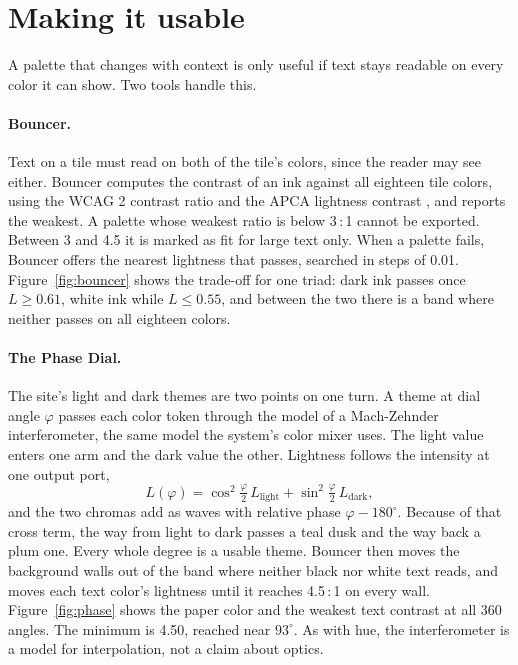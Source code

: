\documentclass[11pt,a4paper]{article}
\theoremstyle{qresult}
\begin{document}
\section{Making it usable}
\label{sec:usable}

A palette that changes with context is only useful if text stays readable on every color it can show. Two tools
handle this.

\paragraph{Bouncer.} Text on a tile must read on both of the tile's colors, since the reader may see either. Bouncer
computes the contrast of an ink against all eighteen tile colors, using the WCAG 2 contrast ratio \citep{wcag22} and
the APCA lightness contrast \citep{apca}, and reports the weakest. A palette whose weakest ratio is below 3\,:\,1
cannot be exported. Between 3 and 4.5 it is marked as fit for large text only. When a palette fails, Bouncer offers
the nearest lightness that passes, searched in steps of 0.01. Figure~\ref{fig:bouncer} shows the trade-off for one
triad: dark ink passes once $L \ge 0.61$, white ink while $L \le 0.55$, and between the two there is a band where
neither passes on all eighteen colors.

\paragraph{The Phase Dial.} The site's light and dark themes are two points on one turn. A theme at dial angle
$\varphi$ passes each color token through the model of a Mach-Zehnder interferometer, the same model the system's
color mixer uses. The light value enters one arm and the dark value the other. Lightness follows the intensity at one
output port,
\begin{equation}
  L(\varphi) = \cos^2\!\tfrac{\varphi}{2}\, L_{\text{light}} + \sin^2\!\tfrac{\varphi}{2}\, L_{\text{dark}},
\end{equation}
and the two chromas add as waves with relative phase $\varphi - 180^\circ$. Because of that cross term, the way from
light to dark passes a teal dusk and the way back a plum one. Every whole degree is a usable theme. Bouncer then moves
the background walls out of the band where neither black nor white text reads, and moves each text color's lightness
until it reaches 4.5\,:\,1 on every wall. Figure~\ref{fig:phase} shows the paper color and the weakest text contrast
at all 360 angles. The minimum is 4.50, reached near $93^\circ$. As with hue, the interferometer is a model for
interpolation, not a claim about optics.
\end{document}
